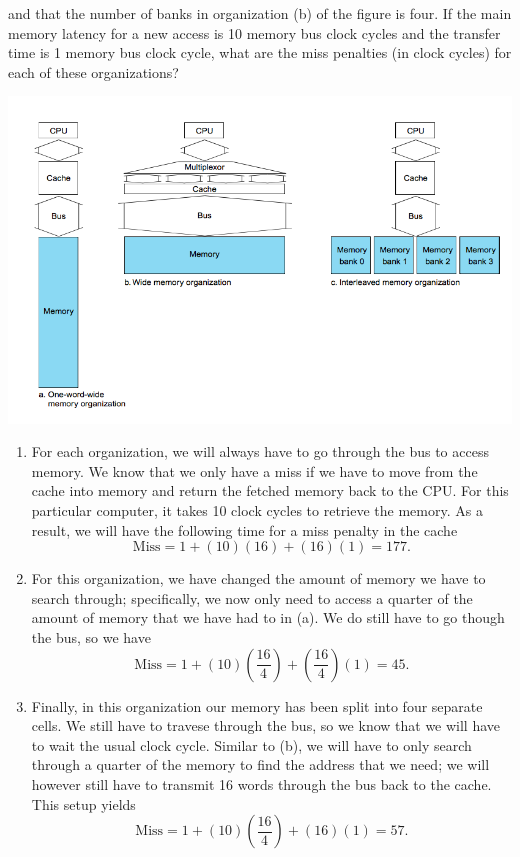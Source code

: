 \documentclass{article}
\begin{document}
\begin{enumerate}
and that the number of banks in organization (b) of the figure is four.
If the main memory latency for a new access is 10 memory bus clock cycles and the transfer time is 1 memory bus clock cycle, what are the miss penalties (in clock cycles) for each of these organizations?
\begin{center}
\includegraphics[scale=0.5]{hw5_graphic2}
\end{center}
\begin{enumerate}
\item For each organization, we will always have to go through the bus to access memory.
We know that we only have a miss if we have to move from the cache into memory and return the fetched memory back to the CPU.
For this particular computer, it takes 10 clock cycles to retrieve the memory.
As a result, we will have the following time for a miss penalty in the cache
\[
\text{Miss} = 1 + (10)(16) + (16)(1) = 177.
\]
\item For this organization, we have changed the amount of memory we have to search through; specifically, we now only need to access a quarter of the amount of memory that we have had to in (a).
We do still have to go though the bus, so we have
\[
\text{Miss} = 1 + (10)\left(\frac{16}{4}\right) + \left(\frac{16}{4}\right)(1) = 45.
\]
\item Finally, in this organization our memory has been split into four separate cells.
We still have to travese through the bus, so we know that we will have to wait the usual clock cycle.
Similar to (b), we will have to only search through a quarter of the memory to find the address that we need; we will however still have to transmit 16 words through the bus back to the cache.
This setup yields
\[
\text{Miss} = 1 + (10)\left(\frac{16}{4}\right) + (16)(1) = 57.
\]
\end{enumerate}
\end{enumerate}
\end{document}
